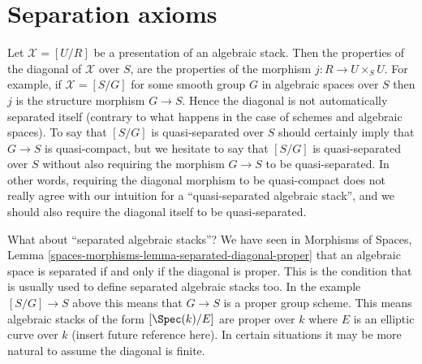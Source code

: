 \section{Separation axioms}
\label{section-separated}

\noindent
Let $\mathcal{X} = [U/R]$ be a presentation of an algebraic stack.
Then the properties of the diagonal of $\mathcal{X}$ over $S$, are
the properties of the morphism $j : R \to U \times_S U$. For example,
if $\mathcal{X} = [S/G]$ for some smooth group $G$ in algebraic spaces
over $S$ then $j$ is the structure morphism $G \to S$. Hence the diagonal
is not automatically separated itself (contrary to what happens in the
case of schemes and algebraic spaces). To say that $[S/G]$ is quasi-separated
over $S$ should certainly imply that $G \to S$ is quasi-compact, but we
hesitate to say that $[S/G]$ is quasi-separated over $S$ without also
requiring the morphism $G \to S$ to be quasi-separated. In other words,
requiring the diagonal morphism to be quasi-compact does not really agree
with our intuition for a ``quasi-separated algebraic stack'', and we should
also require the diagonal itself to be quasi-separated.

\medskip\noindent
What about ``separated algebraic stacks''? We have seen in
Morphisms of Spaces,
Lemma \ref{spaces-morphisms-lemma-separated-diagonal-proper}
that an algebraic space is separated if and only if the diagonal is proper.
This is the condition that is usually used to define separated algebraic
stacks too. In the example $[S/G] \to S$ above this means that $G \to S$
is a proper group scheme. This means algebraic stacks of the form
$[\Spec(k)/E]$ are proper over $k$ where $E$ is an elliptic curve
over $k$ (insert future reference here). In certain situations it may be
more natural to assume the diagonal is finite.

